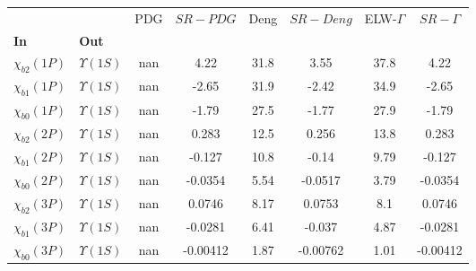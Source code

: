 \begin{tabular}{l|l|c|c|c|c|c|c}
\toprule
                &                &  PDG & $SR-PDG$ &  Deng & $SR-Deng$ &  ELW-$\Gamma$ & $SR-\Gamma$ \\
\textbf{In} & \textbf{Out} &      &          &       &           &               &             \\
\midrule
\textbf{$\chi_{b2}(1P)$} & \textbf{$\Upsilon(1S)$} &  nan &     4.22 &  31.8 &      3.55 &          37.8 &        4.22 \\
\textbf{$\chi_{b1}(1P)$} & \textbf{$\Upsilon(1S)$} &  nan &    -2.65 &  31.9 &     -2.42 &          34.9 &       -2.65 \\
\textbf{$\chi_{b0}(1P)$} & \textbf{$\Upsilon(1S)$} &  nan &    -1.79 &  27.5 &     -1.77 &          27.9 &       -1.79 \\
\textbf{$\chi_{b2}(2P)$} & \textbf{$\Upsilon(1S)$} &  nan &    0.283 &  12.5 &     0.256 &          13.8 &       0.283 \\
\textbf{$\chi_{b1}(2P)$} & \textbf{$\Upsilon(1S)$} &  nan &   -0.127 &  10.8 &     -0.14 &          9.79 &      -0.127 \\
\textbf{$\chi_{b0}(2P)$} & \textbf{$\Upsilon(1S)$} &  nan &  -0.0354 &  5.54 &   -0.0517 &          3.79 &     -0.0354 \\
\textbf{$\chi_{b2}(3P)$} & \textbf{$\Upsilon(1S)$} &  nan &   0.0746 &  8.17 &    0.0753 &           8.1 &      0.0746 \\
\textbf{$\chi_{b1}(3P)$} & \textbf{$\Upsilon(1S)$} &  nan &  -0.0281 &  6.41 &    -0.037 &          4.87 &     -0.0281 \\
\textbf{$\chi_{b0}(3P)$} & \textbf{$\Upsilon(1S)$} &  nan & -0.00412 &  1.87 &  -0.00762 &          1.01 &    -0.00412 \\
\bottomrule
\end{tabular}
